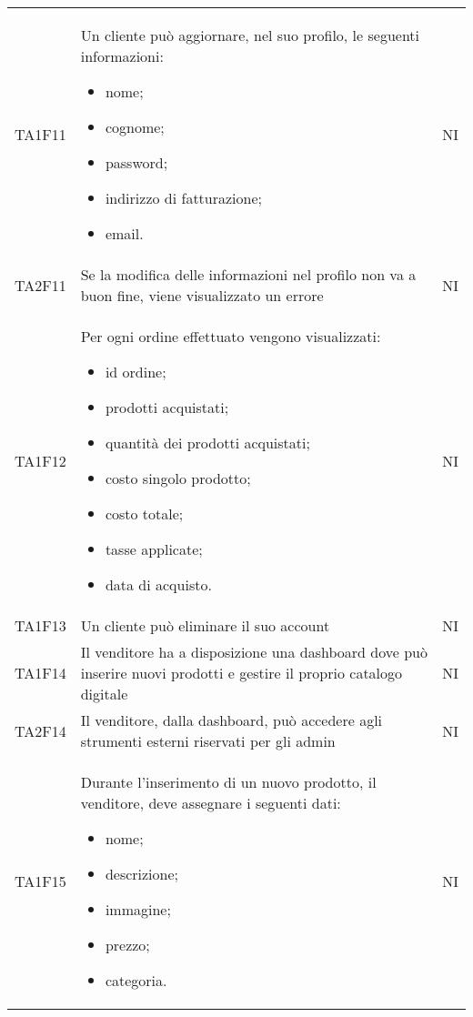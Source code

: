{\begin{longtable}{C{3cm} C{10.2cm} C{1.5cm}}
TA1F11 & Un cliente può aggiornare, nel suo profilo, le seguenti informazioni:
\begin{itemize}
	\item nome;
	\item cognome;
	\item password;
	\item indirizzo di fatturazione;
	\item email.
\end{itemize}
& NI\\

TA2F11 & Se la modifica delle informazioni nel profilo non va a buon fine, viene visualizzato un errore & NI\\

TA1F12 & Per ogni ordine effettuato vengono visualizzati:
\begin{itemize}
	\item id ordine;
	\item prodotti acquistati;
	\item quantità dei prodotti acquistati;
	\item costo singolo prodotto;
	\item costo totale;
	\item tasse applicate;
	\item data di acquisto.
\end{itemize}
& NI\\

TA1F13 & Un cliente può eliminare il suo account & NI\\

TA1F14 & Il venditore ha a disposizione una dashboard dove può inserire nuovi prodotti e gestire il proprio catalogo digitale & NI\\

TA2F14 & Il venditore, dalla dashboard, può accedere agli strumenti esterni riservati per gli admin & NI\\

TA1F15 & Durante l'inserimento di un nuovo prodotto, il venditore, deve assegnare i seguenti dati:
\begin{itemize}
	\item nome;
	\item descrizione;
	\item immagine;
	\item prezzo;
	\item categoria.
\end{itemize} & NI\\


\end{longtable}}
